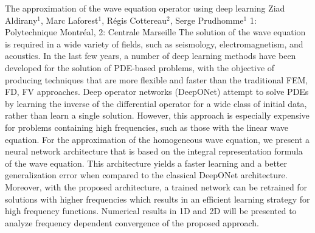 \begin{addmargin}[2em]{0em}
\vspace{1.5ex}
\abs
{The approximation of the wave equation operator using deep learning }
{Ziad Aldirany$^{1}$, Marc Laforest$^{1}$, Régis Cottereau$^2$, Serge
Prudhomme$^{1}$ }
{1: Polytechnique Montréal, 2: Centrale Marseille}
{The solution of the wave equation is required in a wide variety of
fields, such as seismology, electromagnetism, and acoustics. In the
last few years, a number of deep learning methods have been developed for the solution
of PDE-based problems, with the objective of producing techniques that
are more flexible and faster than the traditional FEM, FD, FV
approaches. Deep operator networks (DeepONet) attempt to solve PDEs by
learning the inverse of the differential operator for a wide class of
initial data, rather than learn a single solution. However, this
approach is especially expensive for problems containing high
frequencies, such as those with the linear wave equation.
For the approximation of the homogeneous wave equation, we present a
neural network architecture that is based on the integral
representation formula of the wave equation.
This architecture yields a faster learning and a better generalization
error when compared to the classical DeepONet architecture. Moreover,
with the proposed architecture, a trained network can be retrained for
solutions with higher frequencies which results in an efficient
learning strategy for high frequency functions.
Numerical results in 1D and 2D will be presented to analyze frequency
dependent convergence of the proposed approach. }



\end{addmargin}
